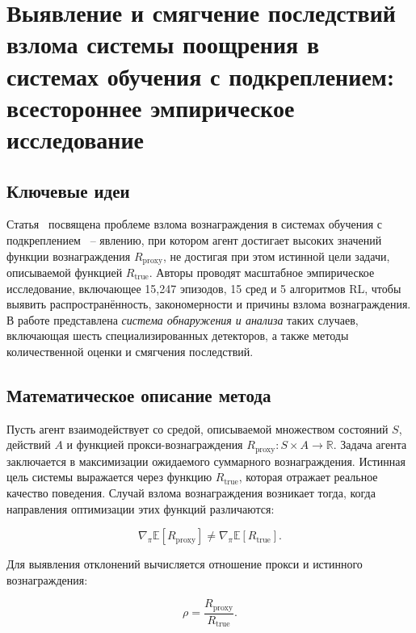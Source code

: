 \section{Выявление и смягчение последствий взлома системы поощрения в системах обучения с подкреплением: всестороннее эмпирическое исследование}


\subsection{Ключевые идеи}

Статья~\cite{shihab2025detectreward} посвящена проблеме взлома вознаграждения  в системах обучения с подкреплением ~-- явлению, при котором агент достигает высоких значений функции вознаграждения $R_{\text{proxy}}$, не достигая при этом истинной цели задачи, описываемой функцией $R_{\text{true}}$. Авторы проводят масштабное эмпирическое исследование, включающее 15,247 эпизодов, 15 сред и 5 алгоритмов RL, чтобы выявить распространённость, закономерности и причины взлома вознаграждения. В работе представлена \emph{система обнаружения и анализа} таких случаев, включающая шесть специализированных детекторов, а также методы количественной оценки и смягчения последствий.

\subsection{Математическое описание метода}

Пусть агент взаимодействует со средой, описываемой множеством состояний $S$, действий $A$ и функцией прокси-вознаграждения $R_{\text{proxy}}: S \times A \rightarrow \mathbb{R}$. Задача агента заключается в максимизации ожидаемого суммарного вознаграждения. Истинная цель системы выражается через функцию $R_{\text{true}}$, которая отражает реальное качество поведения. Случай взлома вознаграждения возникает тогда, когда направления оптимизации этих функций различаются:

\begin{equation}
\nabla_{\pi} \mathbb{E}[R_{\text{proxy}}] \neq \nabla_{\pi} \mathbb{E}[R_{\text{true}}].
\end{equation}

Для выявления отклонений вычисляется отношение прокси и истинного вознаграждения:

\begin{equation}
\rho = \frac{R_{\text{proxy}}}{R_{\text{true}}}.
\end{equation}

